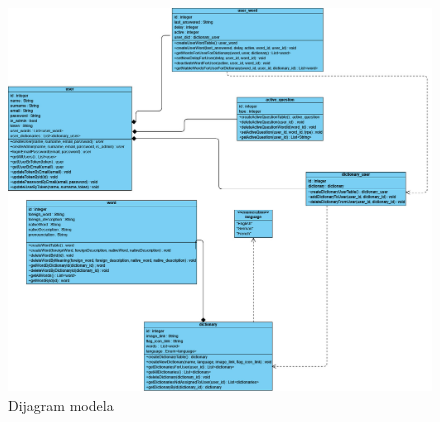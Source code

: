 				\begin{figure}[H]
					\includegraphics[width=1.1\textwidth]{dijagrami/slika3.jpg} 
					\centering
					\caption{Dijagram modela}
					\label{fig:class_diagram}
				\end{figure}			
			\eject
			
